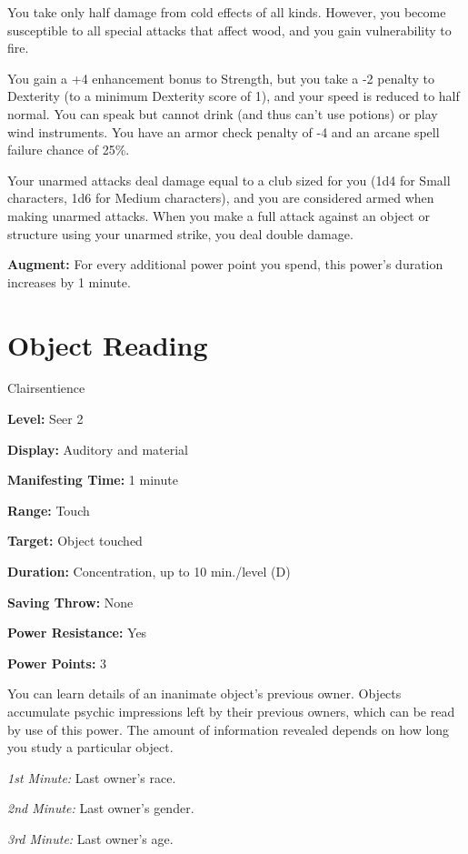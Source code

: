\documentclass{article}
\begin{document}
You take only half damage from cold effects of all kinds. However, you become susceptible 
to all special attacks that affect wood, and you gain vulnerability to fire.

You gain a +4 enhancement bonus to Strength, but you take a -2 penalty to Dexterity 
(to a minimum Dexterity score of 1), and your speed is reduced to half normal. 
You can speak but cannot drink (and thus can't use potions) or play wind instruments. 
You have an armor check penalty of -4 and an arcane spell failure chance of 25\%.

Your unarmed attacks deal damage equal to a club sized for you (1d4 for Small characters, 
1d6 for Medium characters), and you are considered armed when making unarmed attacks. 
When you make a full attack against an object or structure using your unarmed strike, 
you deal double damage.

\textbf{Augment:} For every additional power point you spend, this power's duration 
increases by 1 minute.

\vspace{12pt}
\section*{Object Reading}

Clairsentience

\textbf{Level:} Seer 2

\textbf{Display:} Auditory and material

\textbf{Manifesting Time:} 1 minute

\textbf{Range:} Touch

\textbf{Target:} Object touched

\textbf{Duration:} Concentration, up to 10 min./level (D)

\textbf{Saving Throw:} None

\textbf{Power Resistance:} Yes

\textbf{Power Points:} 3

You can learn details of an inanimate object's previous owner. Objects accumulate 
psychic impressions left by their previous owners, which can be read by use of 
this power. The amount of information revealed depends on how long you study a 
particular object.

\textit{1st Minute: }Last owner's race.

\textit{2nd Minute: }Last owner's gender.

\textit{3rd Minute: }Last owner's age.
\end{document}
